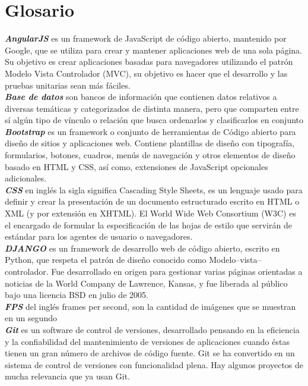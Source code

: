 \documentclass[12pt]{article}
\begin{document}
\clearpage
\section{Glosario}
\textbf{\textit{AngularJS}} es un framework de JavaScript de código abierto, mantenido por Google, que se utiliza para crear y mantener aplicaciones web de una sola página. Su objetivo es crear aplicaciones basadas para navegadores utilizando el patrón Modelo Vista Controlador (MVC), su objetivo es hacer que el desarrollo y las pruebas unitarias sean más fáciles.\\
\textbf{\textit{Base de datos}} son bancos de información que contienen datos relativos a diversas temáticas y categorizados de distinta manera, pero que comparten entre sí algún tipo de vínculo o relación que busca ordenarlos y clasificarlos en conjunto\\
\textbf{\textit{Bootstrap}} es un framework o conjunto de herramientas de Código abierto para diseño de sitios y aplicaciones web. Contiene plantillas de diseño con tipografía, formularios, botones, cuadros, menús de navegación y otros elementos de diseño basado en HTML y CSS, así como, extensiones de JavaScript opcionales adicionales.\\
\textbf{\textit{CSS}} en inglés la sigla significa Cascading Style Sheets, es un lenguaje usado para definir y crear la presentación de un documento estructurado escrito en HTML o XML (y por extensión en XHTML). El World Wide Web Consortium (W3C) es el encargado de formular la especificación de las hojas de estilo que servirán de estándar para los agentes de usuario o navegadores.\\
\textbf{\textit{DJANGO}} es un framework de desarrollo web de código abierto, escrito en Python, que respeta el patrón de diseño conocido como Modelo–vista–controlador. Fue desarrollado en origen para gestionar varias páginas orientadas a noticias de la World Company de Lawrence, Kansas, y fue liberada al público bajo una licencia BSD en julio de 2005.\\
\textbf{\textit{FPS}} del inglés frames per second, son la cantidad de imágenes que se muestran en un segundo\\
\textbf{\textit{Git}}  es un software de control de versiones, desarrollado pensando en la eficiencia y la confiabilidad del mantenimiento de versiones de aplicaciones cuando éstas tienen un gran número de archivos de código fuente. Git se ha convertido en un sistema de control de versiones con funcionalidad plena. Hay algunos proyectos de mucha relevancia que ya usan Git.\\
\end{document}
